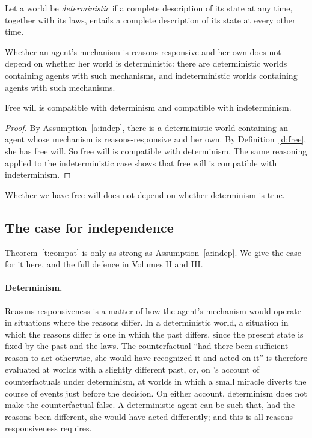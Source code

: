 \documentclass{situationist-preprint}
\begin{document}
Let a world be \emph{deterministic} if a complete description of its state at any time, together with its laws, entails a complete description of its state at every other time.

\begin{assumption}[Independence]\label{a:indep}
Whether an agent's mechanism is reasons-responsive and her own does not depend on whether her world is deterministic: there are deterministic worlds containing agents with such mechanisms, and indeterministic worlds containing agents with such mechanisms.
\end{assumption}

\begin{theorem}[Compatibility]\label{t:compat}
Free will is compatible with determinism and compatible with indeterminism.
\end{theorem}

\begin{proof}
By Assumption~\ref{a:indep}, there is a deterministic world containing an agent whose mechanism is reasons-responsive and her own. By Definition~\ref{d:free}, she has free will. So free will is compatible with determinism. The same reasoning applied to the indeterministic case shows that free will is compatible with indeterminism.
\end{proof}

\begin{corollary}\label{c:open}
Whether we have free will does not depend on whether determinism is true.
\end{corollary}

\subsection{The case for independence}

Theorem~\ref{t:compat} is only as strong as Assumption~\ref{a:indep}. We give the case for it here, and the full defence in Volumes II and III.

\paragraph{Determinism.} Reasons-responsiveness is a matter of how the agent's mechanism would operate in situations where the reasons differ. In a deterministic world, a situation in which the reasons differ is one in which the past differs, since the present state is fixed by the past and the laws. The counterfactual \enquote{had there been sufficient reason to act otherwise, she would have recognized it and acted on it} is therefore evaluated at worlds with a slightly different past, or, on \citet{Lewis1981}'s account of counterfactuals under determinism, at worlds in which a small miracle diverts the course of events just before the decision. On either account, determinism does not make the counterfactual false. A deterministic agent can be such that, had the reasons been different, she would have acted differently; and this is all reasons-responsiveness requires.
\end{document}
